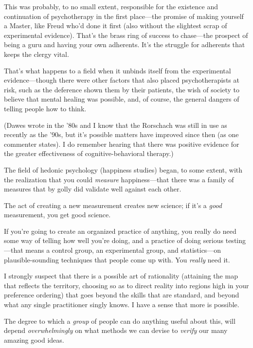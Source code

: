{
 This was probably, to no small extent, responsible for the
existence and continuation of psychotherapy in the first place---the
promise of making yourself a Master, like Freud who'd
done it first (also without the slightest scrap of experimental
evidence). That's the brass ring of success to
chase---the prospect of being a guru and having your own adherents.
It's the struggle for adherents that keeps the clergy
vital.}

{
 That's what happens to a field when it unbinds
itself from the experimental evidence---though there were other factors
that also placed psychotherapists at risk, such as the deference shown
them by their patients, the wish of society to believe that mental
healing was possible, and, of course, the general dangers of telling
people how to think.}

{
 (Dawes wrote in the '80s and I know that the
Rorschach was still in use as recently as the '90s, but
it's possible matters have improved since then (as one
commenter states). I do remember hearing that there was positive
evidence for the greater effectiveness of cognitive-behavioral
therapy.)}

{
 The field of hedonic psychology (happiness studies) began, to some
extent, with the realization that you could \textit{measure}
happiness---that there was a family of measures that by golly did
validate well against each other.}

{
 The act of creating a new measurement creates new science; if
it's a \textit{good} measurement, you get good
science.}

{
 If you're going to create an organized practice of
anything, you really do need some way of telling how well
you're doing, and a practice of doing serious
testing---that means a control group, an experimental group, and
statistics---on plausible-sounding techniques that people come up with.
You \textit{really} need it.}

\myendsectiontext


\bigskip


{
 I strongly suspect that there is a possible art of rationality
(attaining the map that reflects the territory, choosing so as to
direct reality into regions high in your preference ordering) that goes
beyond the skills that are standard, and beyond what any single
practitioner singly knows. I have a sense that more is possible. }

{
 The degree to which a \textit{group} of people can do anything
useful about this, will depend \textit{overwhelmingly} on what methods
we can devise to \textit{verify} our many amazing good ideas.}

